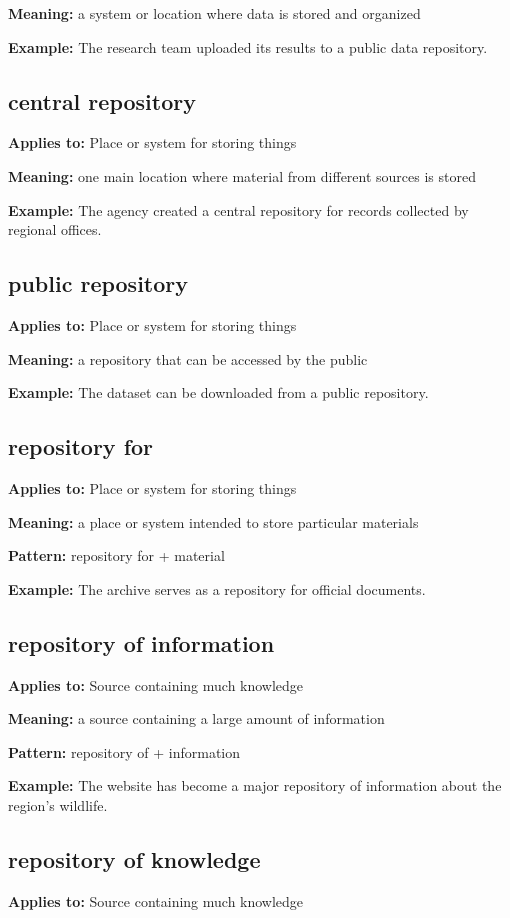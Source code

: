 \documentclass[11pt]{article}
\begin{document}
\textbf{Meaning:} a system or location where data is stored and organized

\textbf{Example:} The research team uploaded its results to a public data repository.

\subsection{central repository}
\textbf{Applies to:} Place or system for storing things

\textbf{Meaning:} one main location where material from different sources is stored

\textbf{Example:} The agency created a central repository for records collected by regional offices.

\subsection{public repository}
\textbf{Applies to:} Place or system for storing things

\textbf{Meaning:} a repository that can be accessed by the public

\textbf{Example:} The dataset can be downloaded from a public repository.

\subsection{repository for}
\textbf{Applies to:} Place or system for storing things

\textbf{Meaning:} a place or system intended to store particular materials

\textbf{Pattern:} repository for + material

\textbf{Example:} The archive serves as a repository for official documents.

\subsection{repository of information}
\textbf{Applies to:} Source containing much knowledge

\textbf{Meaning:} a source containing a large amount of information

\textbf{Pattern:} repository of + information

\textbf{Example:} The website has become a major repository of information about the region's wildlife.

\subsection{repository of knowledge}
\textbf{Applies to:} Source containing much knowledge
\end{document}
